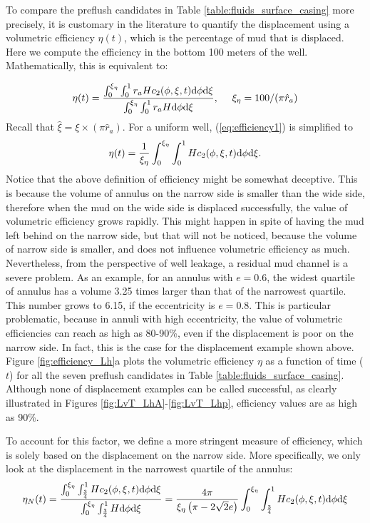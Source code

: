\documentclass[review]{elsarticle}
\def\dd{{\rm d}} %
\begin{document}
To compare the preflush candidates in Table \ref{table:fluids_surface_casing} more precisely, it is customary in the literature to quantify the displacement using a volumetric efficiency $\eta(t)$, which is the percentage of mud that is displaced. Here we compute the efficiency in the bottom 100 meters of the well. Mathematically, this is equivalent to:

\begin{equation}\label{eq:efficiency1}
\eta(t) = \frac{\int_0^{\xi_\eta}\int_0^1 r_a H c_2(\phi, \xi, t) \dd \phi \dd \xi}{\int_0^{\xi_\eta}\int_0^1 r_a H \dd \phi \dd \xi}, ~~~~ \xi_\eta = 100/(\pi\hat r_a)
\end{equation}
%
Recall that $\hat \xi = \xi \times (\pi \hat r_a)$. For a uniform well, (\ref{eq:efficiency1}) is simplified to 
%
\begin{equation}\label{eq:efficiency2}
\eta(t) = \frac{1}{\xi_\eta} \int_0^{\xi_\eta}\int_0^1 H c_2(\phi, \xi, t) \dd \phi \dd \xi.
\end{equation}
%
Notice that the above definition of efficiency might be somewhat deceptive. This is because the volume of annulus on the narrow side is smaller than the wide side, therefore when the mud on the wide side is displaced successfully, the value of volumetric efficiency grows rapidly. This might happen in spite of having the mud left behind on the narrow side, but that will not be noticed, because the volume of narrow side is smaller, and does not influence volumetric efficiency as much. Nevertheless, from the perspective of well leakage, a residual mud channel is a severe problem. As an example, for an annulus with $e=0.6$, the widest quartile of annulus has a volume 3.25 times larger than that of the narrowest quartile. This number grows to 6.15, if the eccentricity is $e=0.8$. This is particular problematic, because in annuli with high eccentricity, the value of volumetric efficiencies can reach as high as 80-90\%, even if the displacement is poor on the narrow side. In fact, this is the case for the displacement example shown above. Figure \ref{fig:efficiency_Lh}a plots the volumetric efficiency $\eta$ as a function of time ($t$) for all the seven preflush candidates in Table \ref{table:fluids_surface_casing}. Although none of displacement examples can be called successful, as clearly illustrated in Figures \ref{fig:LvT_LhA}-\ref{fig:LvT_Lhp}, efficiency values are as high as 90\%. 

To account for this factor, we define a more stringent measure of efficiency, which is solely based on the displacement on the narrow side. More specifically, we only look at the displacement in the narrowest quartile of the annulus:
\begin{equation}\label{eq:efficiencyN1}
\eta_N(t) = \frac{\int_0^{\xi_\eta}\int_{\frac{3}{4}}^1 H c_2(\phi, \xi, t) \dd \phi \dd \xi}{\int_0^{\xi_\eta}\int_{\frac{3}{4}}^1 H \dd \phi \dd \xi}= \frac{4\pi}{\xi_\eta\left(\pi - 2\sqrt{2} e\right)} \int_0^{\xi_\eta}\int_{\frac{3}{4}}^1 H c_2(\phi, \xi, t) \dd \phi \dd \xi
\end{equation}
\end{document}
